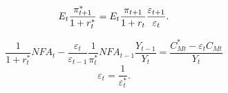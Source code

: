 \documentclass{article}
\begin{document}
\[
E_{t}\frac{\pi _{t+1}^{\ast }}{1+r_{t}^{\ast }}=E_{t}\frac{\pi _{t+1}}{%
1+r_{t}}\frac{\varepsilon _{t+1}}{\varepsilon _{t}}. 
\]

\[
\frac{1}{1+r_{t}^{\ast }}NFA_{t}-\frac{\varepsilon _{t}}{\varepsilon _{t-1}}%
\frac{1}{\pi _{t}^{\ast }}NFA_{t-1}\frac{Y_{t-1}}{Y_{t}}=\frac{C_{Mt}^{\ast
}-\varepsilon _{t}C_{Mt}}{Y_{t}} 
\]%
\[
\varepsilon _{t}=\frac{1}{\varepsilon _{t}^{\ast }}. 
\]
\end{document}
